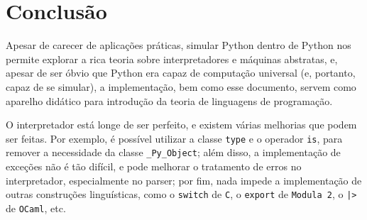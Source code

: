 \chapter{Conclusão}

Apesar de carecer de aplicações práticas, simular
Python dentro de Python nos permite explorar a rica
teoria sobre interpretadores e máquinas abstratas, e,
apesar de ser óbvio que Python era capaz de computação
universal (e, portanto, capaz de se simular), a implementação,
bem como esse documento, servem como aparelho didático para
introdução da teoria de linguagens de programação.

O interpretador está longe de ser perfeito, e existem várias
melhorias que podem ser feitas. Por exemplo, é possível
utilizar a classe \verb|type| e o operador \verb|is|,
para remover a necessidade da classe \verb|_Py_Object|;
além disso, a implementação de exceções não é tão difícil,
e pode melhorar o tratamento de erros no interpretador,
especialmente no parser; por fim, nada impede a implementação
de outras construções linguísticas,
como o \verb|switch| de \texttt{C},
o \verb|export| de \texttt{Modula 2},
o \verb!|>! de \texttt{OCaml},
etc.